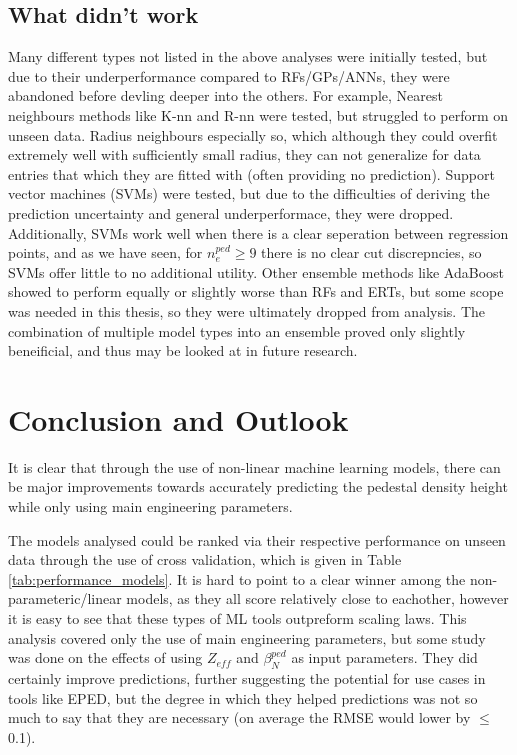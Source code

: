 \documentclass[a4paper, twoside, final, 12pt]{article}
\begin{document}
{\subsection{What didn't work}
Many different types not listed in the above analyses were initially tested, but due to their underperformance compared to RFs/GPs/ANNs, they were abandoned before devling deeper into the others. For example, Nearest neighbours methods like K-nn and R-nn were tested, but struggled to perform on unseen data. Radius neighbours especially so, which although they could overfit extremely well with sufficiently small radius, they can not generalize for data entries that which they are fitted with (often providing no prediction). Support vector machines (SVMs) were tested, but due to the difficulties of deriving the prediction uncertainty and general underperformace, they were dropped. Additionally, SVMs work well when there is a clear seperation between regression points, and as we have seen, for $n_e^{ped} \geq 9$ there is no clear cut discrepncies, so SVMs offer little to no additional utility. Other ensemble methods like AdaBoost showed to perform equally or slightly worse than RFs and ERTs, but some scope was needed in this thesis, so they were ultimately dropped from analysis. The combination of multiple model types into an ensemble proved only slightly beneificial, and thus may be looked at in future research. 
\section{Conclusion and Outlook}
It is clear that through the use of non-linear machine learning models, there can be major improvements towards accurately predicting the pedestal density height while only using main engineering parameters.

The models analysed could be ranked via their respective performance on unseen data through the use of cross validation, which is given in Table \ref{tab:performance_models}.
It is hard to point to a clear winner among the non-parameteric/linear models, as they all score relatively close to eachother, however it is easy to see that these types of ML tools outpreform scaling laws. 
This analysis covered only the use of main engineering parameters, but some study was done on the effects of using $Z_{eff}$ and $\beta_N^{ped}$ as input parameters.
They did certainly improve predictions, further suggesting the potential for use cases in tools like EPED, but the degree in which they helped predictions was not so much to say that they are necessary (on average the RMSE would lower by $\leq$ 0.1).

}
\end{document}
